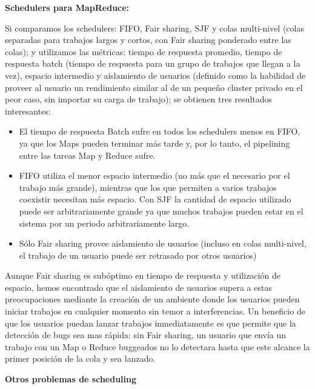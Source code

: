 \begin{center}
	\textbf{Schedulers para MapReduce:}
\end{center}

Si comparamos los schedulers: FIFO, Fair sharing, SJF y colas multi-nivel (colas separadas para trabajos largos y cortos, con Fair sharing ponderado entre las colas); y utilizamos las métricas: tiempo de respuesta promedio, tiempo de respuesta batch (tiempo de respuesta para un grupo de trabajos que llegan a la vez), espacio intermedio y aislamiento de usuarios (definido como la habilidad de proveer al usuario un rendimiento similar al de un pequeño cluster privado en el peor caso, sin importar su carga de trabajo); se obtienen tres resultados interesantes:
\begin{itemize}
	\item El tiempo de respuesta Batch sufre en todos los schedulers menos en FIFO, ya que los Maps pueden terminar más tarde y, por lo tanto, el pipelining entre las tareas Map y Reduce sufre.
	\item FIFO utiliza el menor espacio intermedio (no más que el necesario por el trabajo más grande), mientras que los que permiten a varios trabajos coexistir necesitan más espacio. Con SJF la cantidad de espacio utilizado puede ser arbitrariamente grande ya que muchos trabajos pueden estar en el sistema por un periodo arbitrariamente largo.
	\item Sólo Fair sharing provee aislamiento de usuarios (incluso en colas multi-nivel, el trabajo de un usuario puede ser retrasado por otros usuarios)
\end{itemize}

Aunque Fair sharing es subóptimo en tiempo de respuesta y utilización de espacio, hemos encontrado que el aislamiento de usuarios supera a estas preocupaciones mediante la creación de un ambiente donde los usuarios pueden iniciar trabajos en cualquier momento sin temor a interferencias. Un beneficio de que los usuarios puedan lanzar trabajos inmediatamente es que permite que la detección de bugs sea mas rápida: sin Fair sharing, un usuario que envía un trabajo con un Map o Reduce buggeados no lo detectara hasta que este alcance la primer posición de la cola y sea lanzado.

\begin{center}
	\textbf{Otros problemas de scheduling}
\end{center}

